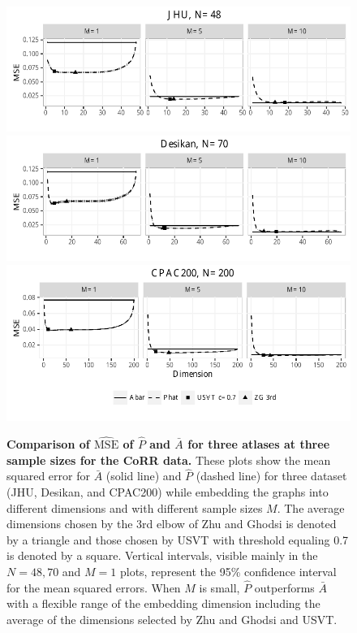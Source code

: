 \documentclass[10pt,letterpaper]{article}
\renewcommand{\hat}{\widehat}
\begin{document}
\begin{figure}[!htbp]
\centering
\includegraphics[width=1\textwidth]{corr_data_MSE_jhu.pdf}\\
\includegraphics[width=1\textwidth]{corr_data_MSE_desikan.pdf}\\
\includegraphics[width=1\textwidth]{corr_data_MSE_CPAC200.pdf}
\caption{{\bf Comparison of $\hat{\mathrm{MSE}}$ of $\hat{P}$ and $\bar{A}$ for three atlases at three sample sizes for the CoRR data.}
These plots show the mean squared error for $\bar{A}$ (solid line) and $\hat{P}$ (dashed line) for three dataset (JHU, Desikan, and CPAC200) while embedding the graphs into different dimensions and with different sample sizes $M$. The average dimensions chosen by the 3rd elbow of Zhu and Ghodsi is denoted by a triangle
 and those chosen by USVT with threshold equaling 0.7 is denoted by a square.
 Vertical intervals, visible mainly in the $N=48,70$ and $M=1$ plots, represent the 95\% confidence interval for the mean squared errors.  When $M$ is small, $\hat{P}$ outperforms $\bar{A}$ with a flexible range of the embedding dimension including the average of the dimensions selected by Zhu and Ghodsi and USVT.}
\label{fig:realdata}
\end{figure}
\end{document}
